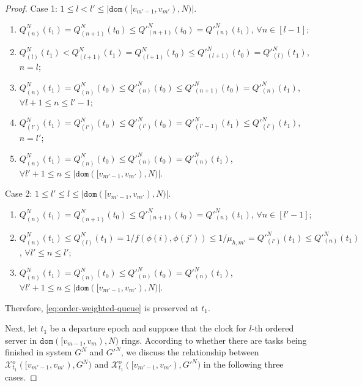\documentclass[11pt, reqno]{article}
\numberwithin{equation}{section}
\numberwithin{theorem}{section}
\newcommand{\dom}{\texttt{dom}}
\begin{document}
\begin{proof}
    \noindent
    Case 1: $1\leq l< l'\leq  |\dom([v_{m'-1},v_{m'}),N)|$. 
     \begin{enumerate}[\normalfont(i)]
         \item $Q^N_{(n)}(t_1)=Q^N_{(n+1)}(t_0)\leq Q'^N_{(n+1)}(t_0)=Q'^N_{(n)}(t_1)$, $\forall n\in[l-1]$;
         \item $Q^N_{(l)}(t_1)<Q^N_{(l+1)}(t_1)=Q^N_{(l+1)}(t_0)\leq Q'^N_{(l+1)}(t_0)=Q'^N_{(l)}(t_1)$, $n=l$;
         \item $Q^N_{(n)}(t_1)=Q^N_{(n)}(t_0)\leq Q'^N_{(n)}(t_0)\leq Q'^N_{(n+1)}(t_0)=Q'^N_{(n)}(t_1)$, $\forall l+1\leq n\leq l'-1$;
         \item $Q^N_{(l')}(t_1)=Q^N_{(l')}(t_0)\leq Q'^N_{(l')}(t_0)=Q'^N_{(l'-1)}(t_1)\leq Q'^N_{(l')}(t_1)$,  $n=l'$;
         \item $Q^N_{(n)}(t_1)=Q^N_{(n)}(t_0)\leq Q'^N_{(n)}(t_0)=Q'^N_{(n)}(t_1)$, $\forall l'+1\leq n\leq |\dom([v_{m'-1},v_{m'}),N)|$.
     \end{enumerate} 
     Case 2: $1\leq l'\leq l\leq  |\dom([v_{m'-1},v_{m'}),N)|$.
     \begin{enumerate}[\normalfont(i)]
         \item $Q^N_{(n)}(t_1)=Q^N_{(n+1)}(t_0)\leq Q'^N_{(n+1)}(t_0)=Q'^N_{(n)}(t_1)$, $\forall n\in[l'-1]$;
         \item $Q^N_{(n)}(t_1)\leq Q^N_{(l)}(t_1)= 1/f(\phi(i),\phi(j'))\leq 1/\mu_{h,m'}=Q'^N_{(l')}(t_1)\leq  Q'^N_{(n)}(t_1)$, $\forall l'\leq n\leq l'$;
         \item $Q^N_{(n)}(t_1)=Q^N_{(n)}(t_0)\leq Q'^N_{(n)}(t_0)=Q'^N_{(n)}(t_1)$, $\forall l'+1\leq n\leq |\dom([v_{m'-1},v_{m'}),N)|$.
     \end{enumerate} 
     Therefore, \eqref{eq:order-weighted-queue} is preserved at  $t_1$.
    \vspace{3mm}
    
    \noindent
Next, let $t_1$ be a departure epoch and suppose that the clock for $l$-th ordered server in $\dom([v_{m-1},v_m),N)$ rings. 
According to whether there are tasks being finished in system $G^N$ and $G'^N$, we discuss the relationship between $ \mathcal{X}^o_{t_1}([v_{m'-1},v_{m'}),G^N)$ and $ \mathcal{X}^o_{t_1}([v_{m'-1},v_{m'}),G'^N)$ in the following three cases.


\end{proof}
\end{document}
